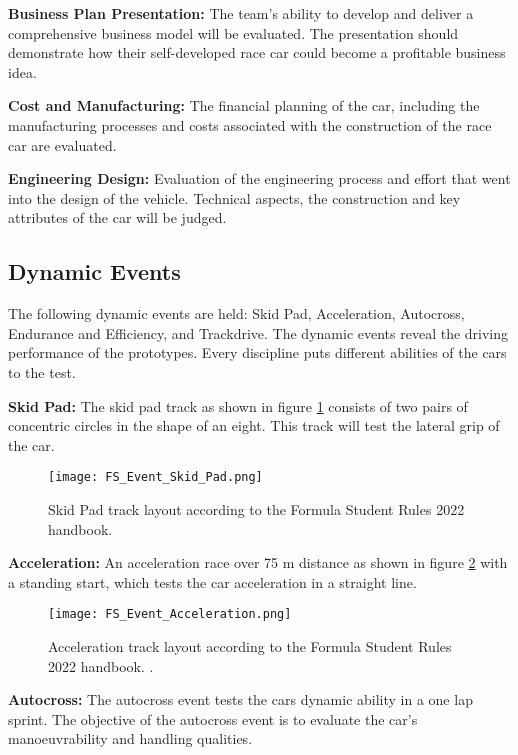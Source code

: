 \textbf{Business Plan Presentation:} The team's ability to develop and deliver a comprehensive business model will be evaluated. The presentation should demonstrate how their self-developed race car could become a profitable business idea.

\textbf{Cost and Manufacturing:} The financial planning of the car, including the manufacturing processes and costs associated with the construction of the race car are evaluated.

\textbf{Engineering Design:} Evaluation of the engineering process and effort that went into the design of the vehicle. Technical aspects, the construction and key attributes of the car will be judged.

\subsection{Dynamic Events}
The following dynamic events are held: Skid Pad, Acceleration, Autocross, Endurance and Efficiency, and Trackdrive.
The dynamic events reveal the driving performance of the prototypes. Every discipline puts different abilities of the cars to the test. \cite{fs_rules_2022_handbook}

\textbf{Skid Pad:} The skid pad track as shown in figure \ref{fig:FS Skid Pad layout} consists of two pairs of concentric circles in the shape of an eight. This track will test the lateral grip of the car.
\begin{figure}[H]
    \centering
    \texttt{[image: FS\_Event\_Skid\_Pad.png]}
    \caption{Skid Pad track layout according to the Formula Student Rules 2022 handbook. \cite{fs_rules_2022_handbook}}
    \label{fig:FS Skid Pad layout}
\end{figure}

\textbf{Acceleration:} An acceleration race over 75 m distance as shown in figure \ref{fig:FS Acceleration layout} with a standing start, which tests the car acceleration in a straight line.
\begin{figure}[H]
    \centering
    \texttt{[image: FS\_Event\_Acceleration.png]}
    \caption{Acceleration track layout according to the Formula Student Rules 2022 handbook. \cite{fs_rules_2022_handbook}.}
    \label{fig:FS Acceleration layout}
\end{figure}

\textbf{Autocross:} The autocross event tests the cars dynamic ability in a one lap sprint. The objective of the autocross event is to evaluate the car's manoeuvrability and handling qualities.

